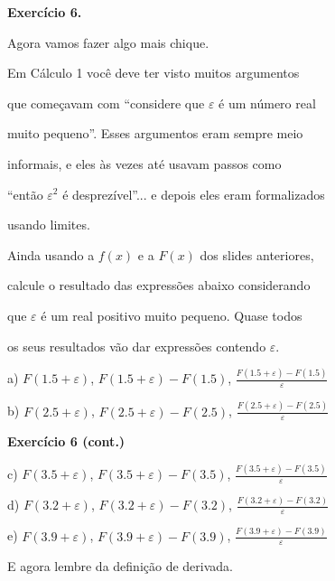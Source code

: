 \documentclass[oneside,12pt]{article}
\begin{document}


\newpage


{\bf Exercício 6.}

Agora vamos fazer algo mais chique.

Em Cálculo 1 você deve ter visto muitos argumentos

que começavam com ``considere que $ε$ é um número real

muito pequeno''. Esses argumentos eram sempre meio

informais, e eles às vezes até usavam passos como

``então $ε^2$ é desprezível''... e depois eles eram formalizados

usando limites.

\msk

Ainda usando a $f(x)$ e a $F(x)$ dos slides anteriores,

calcule o resultado das expressões abaixo considerando

que $ε$ é um real positivo muito pequeno. Quase todos

os seus resultados vão dar expressões contendo $ε$.


\msk

a) $F(1.5+ε)$, $F(1.5+ε) - F(1.5)$, $\frac{F(1.5+ε) - F(1.5)}{ε}$

b) $F(2.5+ε)$, $F(2.5+ε) - F(2.5)$, $\frac{F(2.5+ε) - F(2.5)}{ε}$

\newpage


{\bf Exercício 6 (cont.)}

\msk

c) $F(3.5+ε)$, $F(3.5+ε) - F(3.5)$, $\frac{F(3.5+ε) - F(3.5)}{ε}$

d) $F(3.2+ε)$, $F(3.2+ε) - F(3.2)$, $\frac{F(3.2+ε) - F(3.2)}{ε}$

e) $F(3.9+ε)$, $F(3.9+ε) - F(3.9)$, $\frac{F(3.9+ε) - F(3.9)}{ε}$

\bsk

E agora lembre da definição de derivada.
\end{document}
